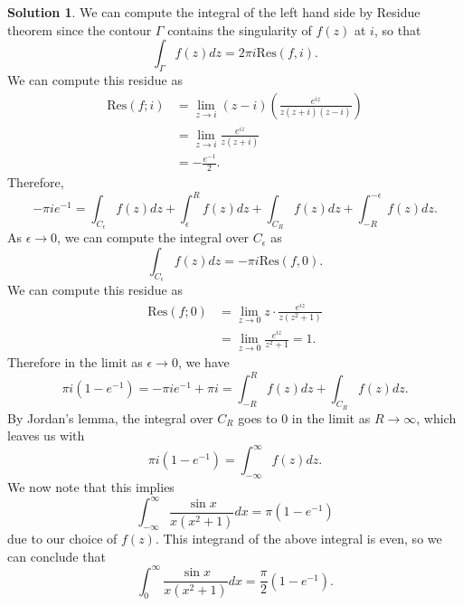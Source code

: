 \documentclass[12pt]{article}
\newcommand{\Res}{\text{Res}}
\theoremstyle{definition}
\newtheorem{sol}{Solution}
\theoremstyle{remark}
\begin{document}
\begin{sol}
We can compute the integral of the left hand side by Residue theorem since the contour $\Gamma$ contains the singularity of $f(z)$ at $i$, so that 
\begin{equation*}
    \int_{\Gamma} f(z) dz = 2\pi i \Res(f, i).
\end{equation*}
We can compute this residue as 
\begin{align*}
    \Res(f;i) &= \lim_{z\to i} (z - i)  \left( \frac{e^{iz}}{z(z + i)(z - i)}\right)\\
              &= \lim_{z\to i} \frac{e^{iz}}{z(z + i)}\\
              &= -\frac{e^{-1}}{2}.
\end{align*}
Therefore, 
\begin{equation*}
-\pi i e^{-1} = \int_{C_{\epsilon}} f(z)dz +  \int_{\epsilon}^{R} f(z)dz +  \int_{C_{R}} f(z)dz +  \int_{-R}^{-\epsilon} f(z)dz. 
\end{equation*}
As $\epsilon \to 0$, we can compute the integral over $C_\epsilon$ as
\begin{equation*}
    \int_{C_{\epsilon}} f(z)dz = -\pi i \Res(f,0).
\end{equation*}
We can compute this residue as 
\begin{align*}
    \Res(f;0) &= \lim_{z\to 0} z \cdot  \frac{e^{iz}}{z(z^{2} + 1)}\\
              &= \lim_{z\to 0} \frac{e^{iz}}{z^{2} + 1} = 1.
\end{align*}
Therefore in the limit as $\epsilon\to 0$, we have 
\begin{equation*}
    \pi i(1 - e^{-1})= -\pi i e^{-1}  + \pi i = \int_{-R}^{R} f(z)dz +  \int_{C_{R}} f(z)dz. 
\end{equation*}
By Jordan's lemma, the integral over $C_R$ goes to 0 in the limit as $R\to \infty$, which leaves us with
\begin{equation*}
    \pi i (1 - e^{-1})= \int_{-\infty}^{\infty} f(z)dz. 
\end{equation*}
We now note that this implies
\begin{equation*}
  \int_{- \infty }^{\infty} \frac{\sin x}{x(x^2+1)} dx = \pi (1 - e^{-1})
\end{equation*}
due to our choice of $f(z)$. This integrand of the above integral is even, so we can conclude that
\begin{equation*}
  \int_{0}^{\infty} \frac{\sin x}{x(x^2+1)} dx = \frac{\pi}{2} (1 - e^{-1}).
\end{equation*}
\end{sol}
\end{document}
